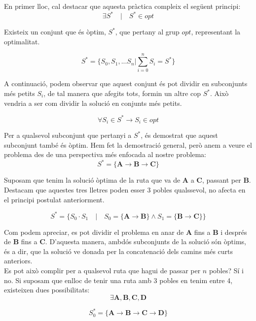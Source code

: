 \documentclass[conference]{IEEEtran}
\begin{document}
    En primer lloc, cal destacar que aquesta pràctica compleix el següent principi:\\

    $$\exists S^{*}\quad |\quad S^{*} \in opt$$

    Existeix un conjunt que és òptim, $S^*$, que pertany al grup $opt$, representant la optimalitat.

    $$S^{*}=\{S_{0},S_{1},...S_{n}|\sum_{i=0}^nS_{i}=S^{*}\}$$

    A continuació, podem observar que aquest conjunt és pot dividir en subconjunts més petits $S_i$, de tal manera que afegits tots, formin un altre cop $S^*$. Això vendria a ser com dividir la solució en conjunts més petits.

    $$\forall S_{i} \in S^{*}\rightarrow S_{i} \in opt$$


    Per a qualsevol subconjunt que pertanyi a $S^*$, és demostrat que aquest subconjunt també és òptim. Hem fet la demostració general, però anem a veure el problema des de una perspectiva més enfocada al nostre problema:\\


    $$S^*=\{\textbf{A}\rightarrow\textbf{B}\rightarrow\textbf{C}\}$$

    Suposam que tenim la solució òptima de la ruta que va de \textbf{A} a \textbf{C}, passant per \textbf{B}. Destacam que aquestes tres lletres poden esser 3 pobles qualssevol, no afecta en el principi postulat anteriorment.

    $$S^*=\{S_{0}\cdot S_{1}\quad|\quad S_{0}=\{\textbf{A}\rightarrow\textbf{B}\} \land S_{1}=\{\textbf{B}\rightarrow\textbf{C}\} \}$$

    Com podem apreciar, es pot dividir el problema en anar de \textbf{A} fins a \textbf{B} i després de \textbf{B} fins a \textbf{C}. D'aquesta manera, ambdós subconjunts de la solució són òptims, és a dir, que la solució ve donada per la concatenació dels camins més curts anteriors. \\

    Es pot això complir per a qualsevol ruta que hagui de passar per $n$ pobles?
    Sí i no. Si suposam que enlloc de tenir una ruta amb 3 pobles en tenim entre 4, existeixen dues possibilitats:\\

    $$\exists \textbf{A},\textbf{B},\textbf{C},\textbf{D}$$

    $$S_{0}^*=\{\textbf{A}\rightarrow \textbf{B}\rightarrow \textbf{C}\rightarrow \textbf{D}\}$$
\end{document}
